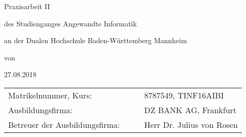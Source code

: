 	\begin{titlepage}
		
		\centering
		{\Large\bfseries \Titel \par}
		\vspace{2cm}
		Praxisarbeit II \par
		\vspace{3cm}
		
		des Studienganges Angewandte Informatik \par
		an der Dualen Hochschule Baden-Württemberg Mannheim \par
		\vspace{3cm}
		
		von \par
		\vspace{0.5cm}
		{\itshape \Autor \par}
		\vspace{2cm}
		27.08.2018 \par
		
		\vspace{6.5cm}
		\begin{tabular}{llll}
			Matrikelnummer, Kurs: & & & 8787549, TINF16AIBI\\
			Ausbildungsfirma: & & & DZ BANK AG, Frankfurt\\
			Betreuer der Ausbildungsfirma: & & & Herr Dr. Julius von Rosen
		\end{tabular}
	\end{titlepage}